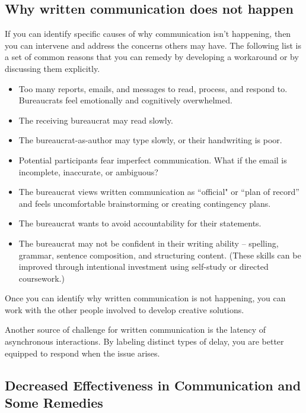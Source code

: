 \subsection*{Why written communication does not happen\label{sec:written-comm-does-not-happen}}
If you can identify specific causes of why communication isn't happening, then you can intervene and address the concerns others may have. The following list is a set of common reasons that you can remedy by developing a workaround or by discussing them explicitly. 
\begin{itemize}
    \item Too many reports, emails, and messages to read, process, and respond to. Bureaucrats feel emotionally and cognitively overwhelmed.
\item The receiving bureaucrat may read slowly.
\item The bureaucrat-as-author may type slowly, or their handwriting is poor.
\item Potential participants fear imperfect communication. What if the email is incomplete, inaccurate, or ambiguous?
\item The bureaucrat views written communication as ``official" or ``plan of record'' and feels uncomfortable brainstorming or creating contingency plans.
\item The bureaucrat wants to avoid accountability for their statements.
\item The bureaucrat may not be confident in their writing ability -- spelling, grammar, sentence composition, and structuring content. (These skills can be improved through intentional investment using self-study or directed coursework.) %
\end{itemize}
Once you can identify why written communication is not happening, you can work with the other people involved to develop creative solutions. 

Another source of challenge for written communication is the latency of asynchronous interactions. By labeling distinct types of delay, you are better equipped to respond when the issue arises. 



\subsection*{Decreased Effectiveness in Communication and Some Remedies}


